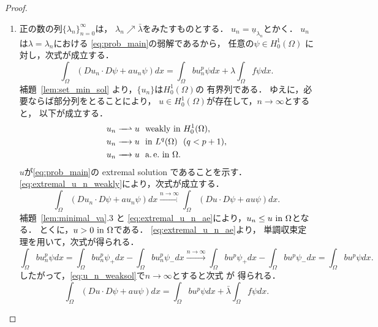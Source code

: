 \begin{proof}
 \begin{enumerate}[1.] \sage
  \item 正の数の列$\{ \lambda_n \}_{n=0}^\infty$は，
        $\lambda_n \nearrow \bar{\lambda}$をみたすものとする．
        $u_n = \underline{u}_{\lambda_n}$とかく．
        $u_n$は$\lambda = \lambda_n$における
         \ref{eq:prob_main}の弱解であるから，
        任意の$\psi \in H_0^1(\Omega)$
        に対し，次式が成立する．
        \begin{equation}
         \int_\Omega (Du_n \cdot D\psi + a u_{n} \psi) dx 
          = \int_\Omega bu_n^p \psi dx + \lambda \int_\Omega f\psi dx.
          \label{eq:u_n_weaksol}
        \end{equation}
        補題~\ref{lem:set_min_sol} より，$\{ u_n \}$は$H_0^1(\Omega)$の
         有界列である．
        ゆえに，必要ならば部分列をとることにより，
        $u \in H_0^1(\Omega)$が存在して，$n \to \infty$とすると，
        以下が成立する．
        \begin{align}
         u_n \xrightharpoonup{ \mbox{ ~ } } u & \ \ \text{weakly~} \tin
         H_0^1(\Omega), \label{eq:extremal_u_n_weakly} \\
         u_n \xrightarrow{ \mbox{ ~ } } u & \ \ \tin L^q(\Omega) \ \
          (q < p+1), \notag \\
         u_n \xrightarrow{ \mbox{ ~ } } u & \ \ \ae \tin \Omega. 
         \label{eq:extremal_u_n_ae}
        \end{align}
        $u$が\ref{eq:prob_main}の extremal solution であることを示す．
        \eqref{eq:extremal_u_n_weakly}により，次式が成立する．
        \[
        \int_\Omega (Du_n \cdot D\psi + a u_n \psi) dx
        \xrightarrow{n \to \infty}
        \int_\Omega (Du \cdot D\psi + a u \psi) dx.
        \]
         補題~\ref{lem:minimal_va}.3 と
        \eqref{eq:extremal_u_n_ae}により，$u_n \leq u ~\text{in}~ \Omega$となる．
        とくに，$u > 0 ~\text{in}~ \Omega$である．
        \eqref{eq:extremal_u_n_ae}より，
        単調収束定理を用いて，次式が得られる．
        \[
        \int_\Omega bu_n^p \psi dx 
        = \int_\Omega bu_n^p \psi_+ dx - 
        \int_\Omega bu_n^p \psi_- dx
        \xrightarrow{n \to \infty}
        \int_\Omega bu^p \psi_+ dx -
        \int_\Omega bu^p \psi_- dx =
        \int_\Omega bu^p \psi dx.
        \]
        したがって，\eqref{eq:u_n_weaksol}で$n \to \infty$とすると次式
        が
        得られる．
        \[ 
         \int_\Omega (Du \cdot D\psi + a u \psi) dx 
          = \int_\Omega bu^p \psi dx + \bar{\lambda} \int_\Omega f\psi dx.
\]
\end{enumerate}
\end{proof}
